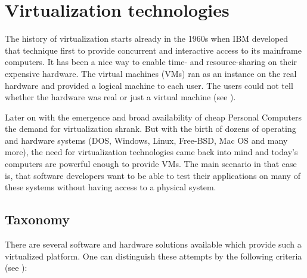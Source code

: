\section{Virtualization technologies}

The  history  of virtualization  starts  already  in  the 1960s  when  IBM
developed  that  technique first  to  provide  concurrent and  interactive
access to its mainframe computers.  It has been a nice way to enable time-
and resource-sharing  on their  expensive hardware.  The  virtual machines
(VMs)  ran as  an instance  on the  real hardware  and provided  a logical
machine to  each user. The users  could not tell whether  the hardware was
real or just a virtual machine (see \cite{virtualization-survey}).

Later  on with  the emergence  and  broad availability  of cheap  Personal
Computers  the demand  for virtualization  shrank. But  with the  birth of
dozens of  operating and hardware systems (DOS,  Windows, Linux, Free-BSD,
Mac OS and many more),  the need for virtualization technologies came back
into mind  and today's computers are  powerful enough to  provide VMs. The
main scenario in that case is, that software developers want to be able to
test their applications on many  of these systems without having access to
a physical system.

\subsection{Taxonomy}

There are several software  and hardware solutions available which provide
such a  virtualized platform.  One can distinguish  these attempts  by the
following criteria (see \cite{virtualization-survey}):

